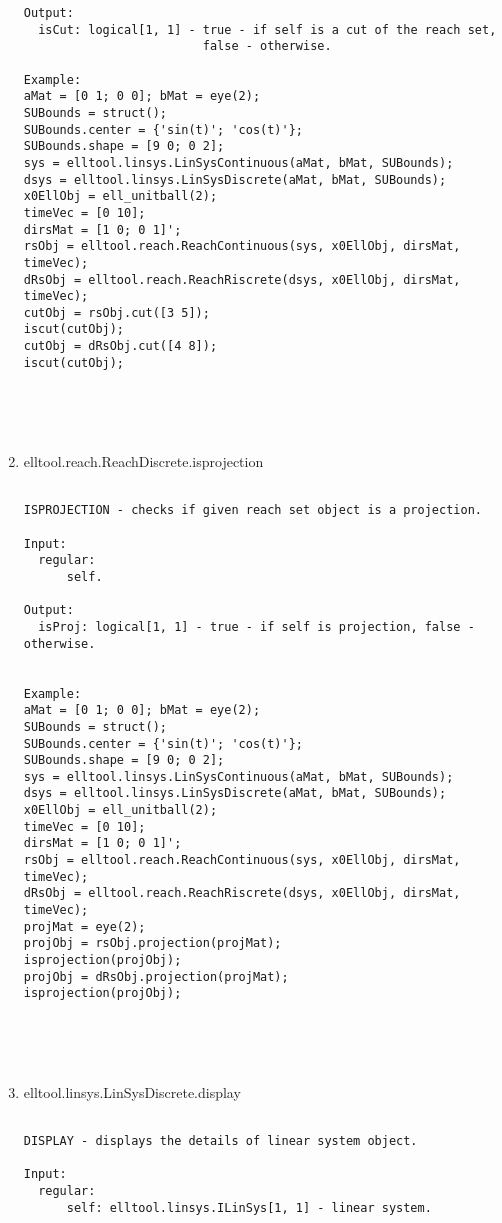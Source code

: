 \begin{enumerate}
\begin{lstlisting}
Output:
  isCut: logical[1, 1] - true - if self is a cut of the reach set,
                         false - otherwise.

Example:
aMat = [0 1; 0 0]; bMat = eye(2);
SUBounds = struct();
SUBounds.center = {'sin(t)'; 'cos(t)'};
SUBounds.shape = [9 0; 0 2];
sys = elltool.linsys.LinSysContinuous(aMat, bMat, SUBounds);
dsys = elltool.linsys.LinSysDiscrete(aMat, bMat, SUBounds);
x0EllObj = ell_unitball(2);
timeVec = [0 10];
dirsMat = [1 0; 0 1]';
rsObj = elltool.reach.ReachContinuous(sys, x0EllObj, dirsMat, timeVec);
dRsObj = elltool.reach.ReachRiscrete(dsys, x0EllObj, dirsMat, timeVec);
cutObj = rsObj.cut([3 5]);
iscut(cutObj);
cutObj = dRsObj.cut([4 8]);
iscut(cutObj);





\end{lstlisting}
\fontfamily{\familydefault}
\selectfont
\item {elltool.reach.ReachDiscrete.isprojection}
\selectfont
\begin{lstlisting}

ISPROJECTION - checks if given reach set object is a projection.

Input:
  regular:
      self.

Output:
  isProj: logical[1, 1] - true - if self is projection, false - otherwise.


Example:
aMat = [0 1; 0 0]; bMat = eye(2);
SUBounds = struct();
SUBounds.center = {'sin(t)'; 'cos(t)'};
SUBounds.shape = [9 0; 0 2];
sys = elltool.linsys.LinSysContinuous(aMat, bMat, SUBounds);
dsys = elltool.linsys.LinSysDiscrete(aMat, bMat, SUBounds);
x0EllObj = ell_unitball(2);
timeVec = [0 10];
dirsMat = [1 0; 0 1]';
rsObj = elltool.reach.ReachContinuous(sys, x0EllObj, dirsMat, timeVec);
dRsObj = elltool.reach.ReachRiscrete(dsys, x0EllObj, dirsMat, timeVec);
projMat = eye(2);
projObj = rsObj.projection(projMat);
isprojection(projObj);
projObj = dRsObj.projection(projMat);
isprojection(projObj);





\end{lstlisting}
\fontfamily{\familydefault}
\selectfont
\item {elltool.linsys.LinSysDiscrete.display}
\selectfont
\begin{lstlisting}

DISPLAY - displays the details of linear system object.

Input:
  regular:
      self: elltool.linsys.ILinSys[1, 1] - linear system.


\end{lstlisting}
\end{enumerate}

